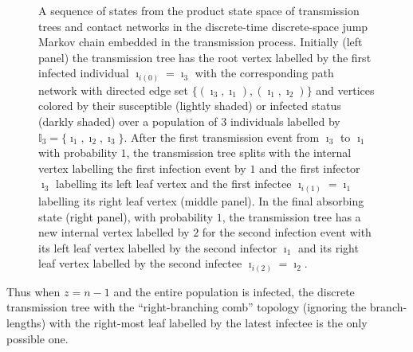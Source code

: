 \documentclass[review]{elsarticle}
\numberwithin{equation}{section}
\newcommand{\bI}{{\mathbb I}}
\begin{document}
\begin{figure}
\begin{center}
\begin {center}
\scalebox{.75}{

}
\end{center}
\caption{A sequence of states from the product state space of transmission trees and contact networks in the discrete-time discrete-space jump Markov chain embedded in the transmission process.  
Initially (left panel) the transmission tree has the root vertex labelled by the first infected individual $\imath_{i(0)} = \imath_3$ with the corresponding path network with directed edge set $\{(\imath_3,\imath_1),(\imath_1,\imath_2)\}$ and vertices colored by their susceptible (lightly shaded) or infected status (darkly shaded) over a population of $3$ individuals labelled by $\bI_3=\{\imath_1,\imath_2,\imath_3\}$.  
After the first transmission event from $\imath_3$ to $\imath_1$ with probability $1$, 
the transmission tree splits with the internal vertex labelling the first infection event by $1$ and the first infector $\imath_3$ labelling its left leaf vertex and the first infectee $\imath_{i(1)}=\imath_1$ labelling its right leaf vertex (middle panel).  
In the final absorbing state (right panel), with probability $1$, the transmission tree has a new internal vertex labelled by $2$ for the second infection event with its left leaf vertex labelled by the second infector $\imath_1$ and its right leaf vertex labelled by the second infectee $\imath_{i(2)}=\imath_2$.\label{F:transTreeNetworkPath}}
\end{center}
\end{figure}

Thus when $z=n-1$ and the entire population is infected, the discrete transmission tree with the ``right-branching comb'' topology (ignoring the branch-lengths) with the right-most leaf labelled by the latest infectee is the only possible one.
\end{document}
